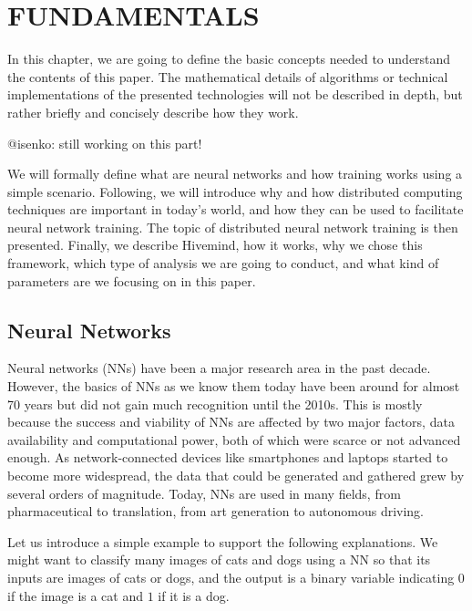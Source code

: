 \chapter{FUNDAMENTALS}\label{chapter:fundamentals}

In this chapter, we are going to define the basic concepts needed to understand the contents of this paper.
The mathematical details of algorithms or technical implementations of the presented technologies will not be described in depth, but rather briefly and concisely describe how they work.

@isenko: still working on this part!

We will formally define what are neural networks and how training works using a simple scenario.
Following, we will introduce why and how distributed computing techniques are important in today's world, and how they can be used to facilitate neural network training.
The topic of distributed neural network training is then presented.
Finally, we describe Hivemind, how it works, why we chose this framework, which type of analysis we are going to conduct, and what kind of parameters are we focusing on in this paper.

\section{Neural Networks}
Neural networks (NNs) have been a major research area in the past decade.
However, the basics of NNs as we know them today have been around for almost 70 years but did not gain much recognition until the 2010s.
This is mostly because the success and viability of NNs are affected by two major factors, data availability and computational power, both of which were scarce or not advanced enough.
As network-connected devices like smartphones and laptops started to become more widespread, the data that could be generated and gathered grew by several orders of magnitude.
Today, NNs are used in many fields, from pharmaceutical to translation, from art generation to autonomous driving.

Let us introduce a simple example to support the following explanations.
We might want to classify many images of cats and dogs using a NN so that its inputs are images of cats or dogs, and the output is a binary variable indicating $0$ if the image is a cat and $1$ if it is a dog.

